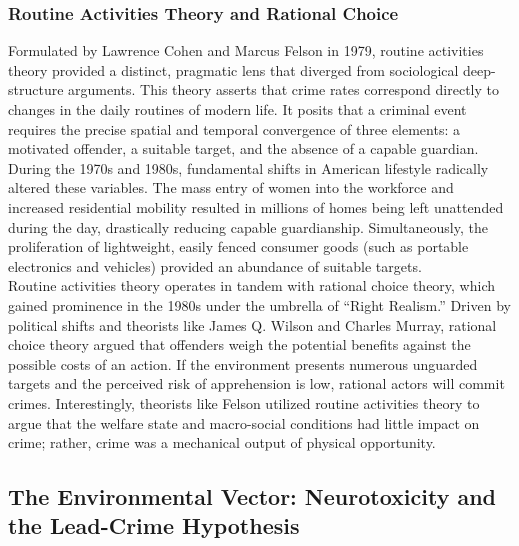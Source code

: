 \documentclass[
]{article}
\begin{document}
\subsubsection{\texorpdfstring{\textbf{Routine Activities Theory and
Rational
Choice}}{Routine Activities Theory and Rational Choice}}\label{routine-activities-theory-and-rational-choice}

Formulated by Lawrence Cohen and Marcus Felson in 1979, routine
activities theory provided a distinct, pragmatic lens that diverged from
sociological deep-structure arguments. This theory asserts that crime
rates correspond directly to changes in the daily routines of modern
life. It posits that a criminal event requires the precise spatial and
temporal convergence of three elements: a motivated offender, a suitable
target, and the absence of a capable guardian.\\
During the 1970s and 1980s, fundamental shifts in American lifestyle
radically altered these variables. The mass entry of women into the
workforce and increased residential mobility resulted in millions of
homes being left unattended during the day, drastically reducing capable
guardianship. Simultaneously, the proliferation of lightweight, easily
fenced consumer goods (such as portable electronics and vehicles)
provided an abundance of suitable targets.\\
Routine activities theory operates in tandem with rational choice
theory, which gained prominence in the 1980s under the umbrella of
``Right Realism.'' Driven by political shifts and theorists like James
Q. Wilson and Charles Murray, rational choice theory argued that
offenders weigh the potential benefits against the possible costs of an
action. If the environment presents numerous unguarded targets and the
perceived risk of apprehension is low, rational actors will commit
crimes. Interestingly, theorists like Felson utilized routine activities
theory to argue that the welfare state and macro-social conditions had
little impact on crime; rather, crime was a mechanical output of
physical opportunity.

\subsection{\texorpdfstring{\textbf{The Environmental Vector:
Neurotoxicity and the Lead-Crime
Hypothesis}}{The Environmental Vector: Neurotoxicity and the Lead-Crime Hypothesis}}\label{the-environmental-vector-neurotoxicity-and-the-lead-crime-hypothesis}
\end{document}
